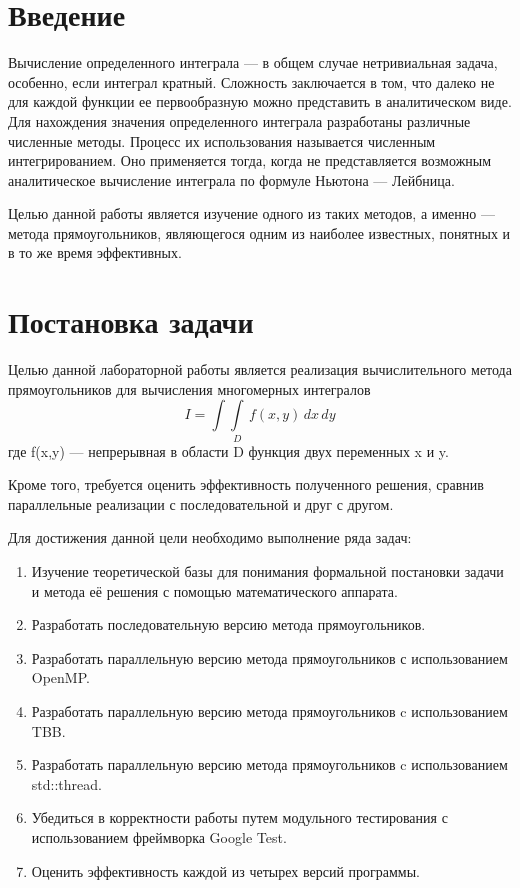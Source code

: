 \documentclass{article}
\begin{document}
\section{Введение}

\par Вычисление определенного интеграла — в общем случае нетривиальная задача, особенно, если интеграл кратный. Сложность заключается в том, что далеко не для каждой функции ее первообразную можно представить в аналитическом виде. Для нахождения значения определенного интеграла разработаны различные численные методы. Процесс их использования называется численным интегрированием. Оно применяется тогда, когда не представляется возможным аналитическое вычисление интеграла по формуле Ньютона — Лейбница.

\par Целью данной работы является изучение одного из таких методов, а именно — метода прямоугольников, являющегося одним из наиболее известных, понятных и в то же время эффективных.

\newpage

\section{Постановка задачи}

\par Целью данной лабораторной работы является реализация вычислительного метода прямоугольников для вычисления многомерных интегралов 
\begin{equation}
I = \int\int\limits_D \, f(x,y) \,dx\,dy
\end{equation}
где f(x,y) — непрерывная в области D функция двух переменных x и y.

\par Кроме того, требуется оценить эффективность полученного решения, сравнив параллельные реализации с последовательной и друг с другом.

\par Для достижения данной цели необходимо выполнение ряда задач:
 
\begin{enumerate}
\item Изучение теоретической базы для понимания формальной постановки задачи и метода её решения с помощью математического аппарата.
\item Разработать последовательную версию метода прямоугольников.
\item Разработать параллельную версию метода прямоугольников с использованием OpenMP.
\item Разработать параллельную версию метода прямоугольников c использованием TBB.
\item Разработать параллельную версию метода прямоугольников c использованием std::thread.
\item Убедиться в корректности работы путем модульного тестирования с использованием фреймворка Google Test.
\item Оценить эффективность каждой из четырех версий программы.
\end{enumerate}
\end{document}
